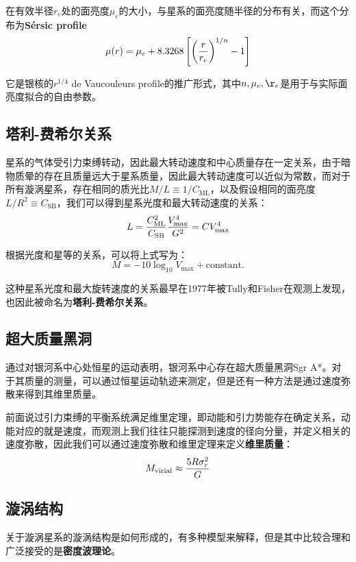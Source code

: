 在有效半径$r_e$处的面亮度$\mu_e$的大小，与星系的面亮度随半径的分布有关，而这个分布为\textbf{Sérsic profile}
\begin{equation}
  \mu(r)=\mu_e+8.3268\left[\left({r\over r_e}\right)^{1/n}-1\right]
\end{equation}

它是银核的$r^{1/4}$ de Vaucouleurs profile的推广形式，其中$n, \mu_e, \r_e$是用于与实际面亮度拟合的自由参数。

\subsection{塔利-费希尔关系}
星系的气体受引力束缚转动，因此最大转动速度和中心质量存在一定关系，由于暗物质晕的存在且质量远大于星系质量，因此最大转动速度可以近似为常数，而对于所有漩涡星系，存在相同的质光比$M/L\equiv 1/C_\mathrm{ML}$，以及假设相同的面亮度$L/R^2\equiv C_\mathrm{SB}$，我们可以得到星系光度和最大转动速度的关系：
\begin{equation}
  L={C_\mathrm{ML}^2\over C_\mathrm{SB}}{V_\mathrm{max}^4\over G^2}=CV_\mathrm{max}^4
\end{equation}

根据光度和星等的关系，可以将上式写为：
\begin{equation}
  M=-10\log_{10}V_\mathrm{max}+\mathrm{constant.}
\end{equation}

这种星系光度和最大旋转速度的关系最早在1977年被Tully和Fisher在观测上发现，也因此被命名为\textbf{塔利-费希尔关系}。

\subsection{超大质量黑洞}
通过对银河系中心处恒星的运动表明，银河系中心存在超大质量黑洞Sgr A*。对于其质量的测量，可以通过恒星运动轨迹来测定，但是还有一种方法是通过速度弥散来得到其维里质量。

前面说过引力束缚的平衡系统满足维里定理，即动能和引力势能存在确定关系，动能对应的就是速度，而观测上我们往往只能探测到速度的径向分量，并定义相关的速度弥散，因此我们可以通过速度弥散和维里定理来定义\textbf{维里质量}：
\begin{equation}
  M_\mathrm{virial}\approx{5R\sigma_r^2\over G}
\end{equation}

\subsection{漩涡结构}
关于漩涡星系的漩涡结构是如何形成的，有多种模型来解释，但是其中比较合理和广泛接受的是\textbf{密度波理论}。

